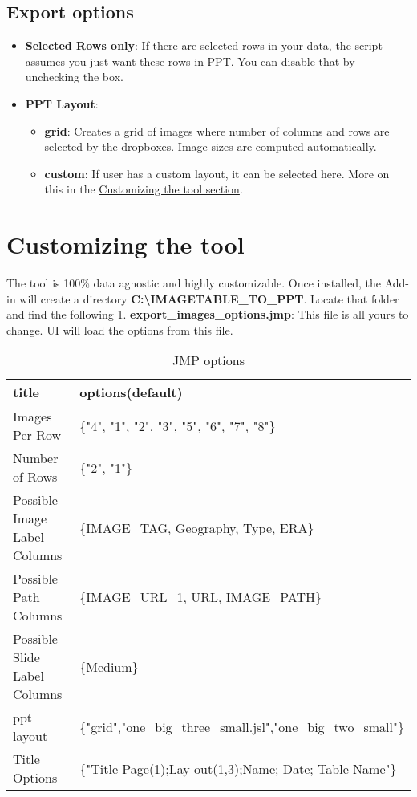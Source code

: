 \documentclass[
]{article}
\providecommand{\tightlist}{%
  \setlength{\itemsep}{0pt}\setlength{\parskip}{0pt}}
\begin{document}
\hypertarget{export-options}{%
\subsection{Export options}\label{export-options}}

\begin{itemize}
\tightlist
\item
  \textbf{Selected Rows only}: If there are selected rows in your data, the script assumes you just want these rows in PPT. You can disable that by unchecking the box.
\item
  \textbf{PPT Layout}:

  \begin{itemize}
  \tightlist
  \item
    \textbf{grid}: Creates a grid of images where number of columns and rows are selected by the dropboxes. Image sizes are computed automatically.
  \item
    \textbf{custom}: If user has a custom layout, it can be selected here. More on this in the \protect\hyperlink{customizing}{Customizing the tool section}.
  \end{itemize}
\end{itemize}

\hypertarget{customizing-the-tool}{%
\section{Customizing the tool }\label{customizing-the-tool}}

The tool is 100\% data agnostic and highly customizable. Once installed, the Add-in will create a directory \textbf{C:\textbackslash IMAGETABLE\_TO\_PPT}. Locate that folder and find the following
1. \textbf{export\_images\_options.jmp}: This file is all yours to change. UI will load the options from this file.

\begin{table}

\caption{\label{tab:unnamed-chunk-1}JMP  options}
\centering
\begin{tabular}[t]{l|l}
\hline
title & options(default)\\
\hline
Images Per Row & \{"4", "1", "2", "3", "5", "6", "7", "8"\}\\
\hline
Number of Rows & \{"2", "1"\}\\
\hline
Possible Image Label Columns & \{IMAGE\_TAG, Geography, Type, ERA\}\\
\hline
Possible Path Columns & \{IMAGE\_URL\_1, URL, IMAGE\_PATH\}\\
\hline
Possible Slide Label Columns & \{Medium\}\\
\hline
ppt layout & \{"grid","one\_big\_three\_small.jsl","one\_big\_two\_small"\}\\
\hline
Title Options & \{"Title Page(1);Lay out(1,3);Name; Date; Table Name"\}\\
\hline
\end{tabular}
\end{table}
\end{document}
